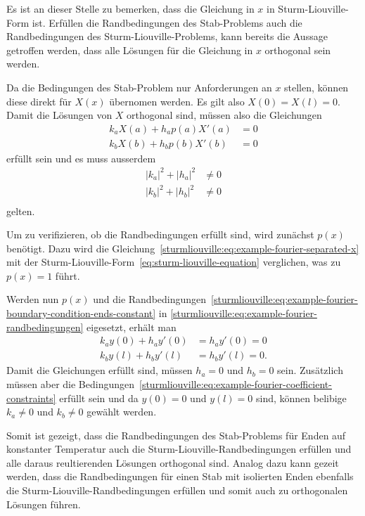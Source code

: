 Es ist an dieser Stelle zu bemerken, dass die Gleichung in $x$ in 
Sturm-Liouville-Form ist.
Erfüllen die Randbedingungen des Stab-Problems auch die Randbedingungen des
Sturm-Liouville-Problems, kann bereits die Aussage getroffen werden, dass alle
Lösungen für die Gleichung in $x$ orthogonal sein werden.

Da die Bedingungen des Stab-Problem nur Anforderungen an $x$ stellen, können
diese direkt für $X(x)$ übernomen werden. Es gilt also $X(0) = X(l) = 0$.
Damit die Lösungen von $X$ orthogonal sind, müssen also die Gleichungen
\begin{equation}
\begin{aligned}
	\label{sturmliouville:eq:example-fourier-randbedingungen}
	k_a X(a) + h_a p(a) X'(a) &= 0 \\
	k_b X(b) + h_b p(b) X'(b) &= 0
\end{aligned}
\end{equation}
erfüllt sein und es muss ausserdem
\begin{equation}
\begin{aligned}
    \label{sturmliouville:eq:example-fourier-coefficient-constraints}
    |k_a|^2 + |h_a|^2 &\neq 0\\
    |k_b|^2 + |h_b|^2 &\neq 0\\
\end{aligned}
\end{equation}
gelten.

Um zu verifizieren, ob die Randbedingungen erfüllt sind, wird zunächst
$p(x)$
benötigt.
Dazu wird die Gleichung~\eqref{sturmliouville:eq:example-fourier-separated-x}
mit der
Sturm-Liouville-Form~\eqref{eq:sturm-liouville-equation} verglichen, was zu
$p(x) = 1$ führt.

Werden nun $p(x)$ und die 
Randbedingungen~\eqref{sturmliouville:eq:example-fourier-boundary-condition-ends-constant}
in \eqref{sturmliouville:eq:example-fourier-randbedingungen} eigesetzt, erhält
man
\[
\begin{aligned}
	k_a y(0) + h_a y'(0) &= h_a y'(0) = 0 \\
	k_b y(l) + h_b y'(l) &= h_b y'(l) = 0.
\end{aligned}
\]
Damit die Gleichungen erfüllt sind, müssen $h_a = 0$ und $h_b = 0$ sein.
Zusätzlich müssen aber die 
Bedingungen~\eqref{sturmliouville:eq:example-fourier-coefficient-constraints}
erfüllt sein und da $y(0) = 0$ und $y(l) = 0$ sind, können belibige $k_a \neq 0$
und $k_b \neq 0$ gewählt werden.

Somit ist gezeigt, dass die Randbedingungen des Stab-Problems für Enden auf
konstanter Temperatur auch die Sturm-Liouville-Randbedingungen erfüllen und
alle daraus reultierenden Lösungen orthogonal sind.
Analog dazu kann gezeit werden, dass die Randbedingungen für einen Stab mit
isolierten Enden ebenfalls die Sturm-Liouville-Randbedingungen erfüllen und
somit auch zu orthogonalen Lösungen führen.

